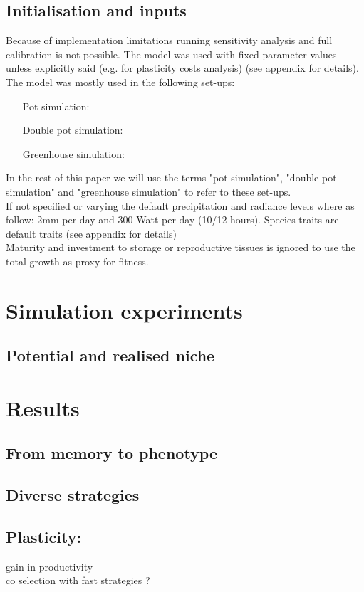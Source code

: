 \documentclass[review]{elsarticle}
\begin{document}
\subsection{Initialisation and inputs}
Because of implementation limitations running sensitivity analysis and full calibration is not possible. The model was used with fixed parameter values unless explicitly said (e.g. for plasticity costs analysis) (see appendix for details). The model was mostly used in the following set-ups:
\begin{itemize}
\item[Pot simulation:]
\item[Double pot simulation:]
\item[Greenhouse simulation:]
\end{itemize}
In the rest of this paper we will use the terms "pot simulation", "double pot simulation" and "greenhouse simulation" to refer  to these set-ups.\\
If not specified or varying the default precipitation and radiance levels where as follow: 2mm per day and 300 Watt per day (10/12 hours). Species traits are default traits (see appendix for details)\\
Maturity and investment to storage or reproductive tissues is ignored to use the total growth as proxy for fitness.

\section{Simulation experiments}

\subsection{Potential and realised niche}

\section{Results}
\subsection{From memory to phenotype}
\subsection{Diverse strategies}

\subsection{Plasticity: }
gain in productivity\\
co selection with fast strategies ?
\end{document}
